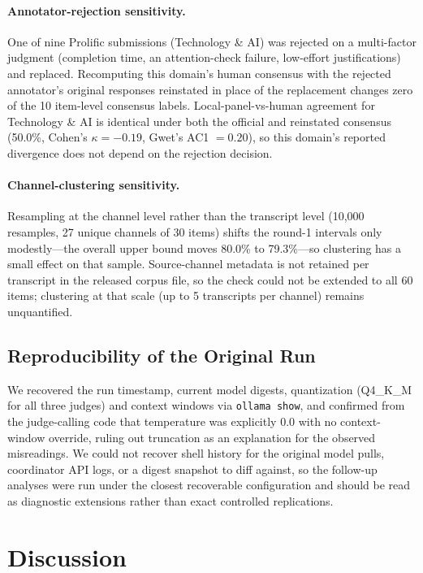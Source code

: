 \documentclass[letterpaper]{article}
\begin{document}
\paragraph{Annotator-rejection sensitivity.}
One of nine Prolific submissions (Technology \& AI) was rejected on a
multi-factor judgment (completion time, an attention-check failure, low-effort
justifications) and replaced. Recomputing this domain's human consensus with
the rejected annotator's original responses reinstated in place of the
replacement changes zero of the 10 item-level consensus labels.
Local-panel-vs-human agreement for Technology \& AI is identical under both
the official and reinstated consensus (50.0\%, Cohen's $\kappa = -0.19$,
Gwet's AC1 $= 0.20$), so this domain's reported divergence does not depend on
the rejection decision.

\paragraph{Channel-clustering sensitivity.}
Resampling at the channel level rather than the transcript level (10{,}000
resamples, 27 unique channels of 30 items) shifts the round-1 intervals only
modestly---the overall upper bound moves 80.0\% to 79.3\%---so clustering has
a small effect on that sample. Source-channel metadata is not retained per
transcript in the released corpus file, so the check could not be extended to
all 60 items; clustering at that scale (up to 5 transcripts per channel)
remains unquantified.

\subsection{Reproducibility of the Original Run}

We recovered the run timestamp, current model digests, quantization
(Q4\_K\_M for all three judges) and context windows via \texttt{ollama show},
and confirmed from the judge-calling code that temperature was explicitly 0.0
with no context-window override, ruling out truncation as an explanation for
the observed misreadings. We could not recover shell history for the original
model pulls, coordinator API logs, or a digest snapshot to diff against, so
the follow-up analyses were run under the closest recoverable configuration
and should be read as diagnostic extensions rather than exact controlled
replications.

\section{Discussion}
\end{document}
